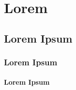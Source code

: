 \documentclass[../thesis.tex]{subfiles}
\begin{document}
\chapter{Lorem}\label{chap:lorem}


\lipsum[1-1]

\section{Lorem Ipsum}

\lipsum[2-2]

\subsection{Lorem Ipsum}

\lipsum[3-3]

\subsubsection{Lorem Ipsum}

\lipsum[4-4]


\end{document}
